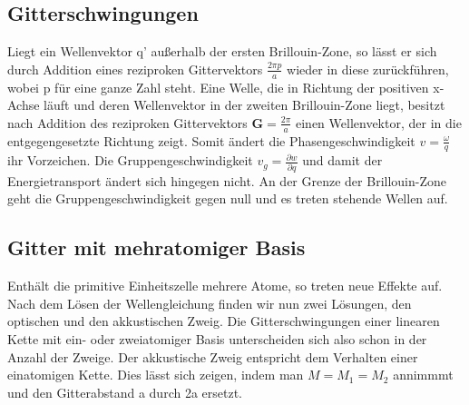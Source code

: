 \documentclass[11pt]{article}
\begin{document}
\subsection{Gitterschwingungen}
Liegt ein Wellenvektor q' außerhalb der ersten Brillouin-Zone, so lässt er sich
durch Addition eines reziproken Gittervektors $\frac{2\pi p}{a}$ wieder in diese
zurückführen, wobei p für eine ganze Zahl steht. Eine Welle, die in Richtung der
positiven x-Achse läuft und deren Wellenvektor in der zweiten Brillouin-Zone
liegt, besitzt nach Addition des reziproken Gittervektors $\bm{G}=\frac{2\pi}
{a}$ einen Wellenvektor, der in die entgegengesetzte Richtung zeigt. Somit
ändert die Phasengeschwindigkeit $v=\frac{\omega}{q}$ ihr Vorzeichen. Die
Gruppengeschwindigkeit $v_g=\frac{\partial w}{\partial q}$ und damit der
Energietransport ändert sich hingegen nicht. An der Grenze der Brillouin-Zone
geht die Gruppengeschwindigkeit gegen null und es treten stehende Wellen auf.
\subsection{Gitter mit mehratomiger Basis}
Enthält die primitive Einheitszelle mehrere Atome, so treten neue Effekte auf.
Nach dem Lösen der Wellengleichung finden wir nun zwei Lösungen, den optischen
und den akkustischen Zweig. Die Gitterschwingungen einer linearen Kette mit
ein- oder zweiatomiger Basis unterscheiden sich also schon in der Anzahl der
Zweige. Der akkustische Zweig entspricht dem Verhalten einer einatomigen Kette.
Dies lässt sich zeigen, indem man $M=M_1=M_2$ annimmmt und den Gitterabstand
a durch 2a ersetzt.
\end{document}
